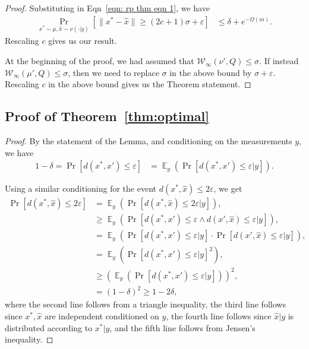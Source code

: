 \documentclass{article}
\newcommand{\norm}[1]{\|#1\|}
\newcommand{\wh}{\widehat}
\newcommand{\eps}{\varepsilon}
\DeclareMathOperator*{\E}{\mathbb{E}}
\newcommand{\xhat}{\wh{x}}
\newcommand{\cW}{\mathcal W}
\begin{document}
\begin{proof}
		Substituting in Eqn~\eqref{eqn: rp thm eqn 1}, we have
		\begin{align*}
			\Pr_{x^*\sim \mu, \widehat{x} \sim \nu( \cdot | y)}\left[\norm{ x^* - \wh{x} } \geq (2c+1)\sigma + \eps \right] & \leq \delta +   e^{-\Omega(m)}.
		\end{align*}
		Rescaling $c$ gives us our result.
		
		At the beginning of the proof, we had assumed that $\cW_\infty(\nu',Q)\leq \sigma$.
		If instead $\cW_\infty(\mu',Q) \leq \sigma$, then we need to replace $\sigma$ in the above bound by $\sigma + \eps$.
		Rescaling $c$ in the above bound gives us the Theorem statement.

\end{proof}

\subsection{Proof of Theorem~\ref{thm:optimal}}
\begin{proof}
By the statement of the Lemma, and conditioning on the measurements $y$, we have
\begin{align*}
    1 - \delta = \Pr[ d(x^* , x') \leq \eps ] &= \E_{y } \left( \Pr[d(x^* , x') \leq \eps | y ] \right).
\end{align*}

Using a similar conditioning for the event $d(x^* , \xhat) \leq 2 \eps$, we get
\begin{align*}
    \Pr[ d(x^* , \xhat) \leq 2\eps ] &= \E_{y} \left( \Pr[ d(x^* , \xhat) \leq 2\eps | y ] \right),\\ 
   &\geq \E_{y}  \left( \Pr[d(x^* , x') \leq \eps  \land d(x' , \xhat) \leq \eps  | y ] \right),\\ 
   &= \E_{y}  \left( \Pr[ d(x^* , x') \leq \eps | y ] \cdot \Pr[ d(x' , \xhat) \leq \eps  | y ] \right),\\ 
   &= \E_{y}  \left( \Pr[ d(x^* , x') \leq \eps | y ]^2  \right),\\ 
   &\geq \left(\E_{y}  \left( \Pr[d(x^* , x') \leq \eps | y ]  \right)\right)^2,\\ 
   &= (1-\delta)^2 \geq 1 - 2\delta,
\end{align*}
where the second line follows from a triangle inequality, the third line follows since $x^*, \xhat$ are independent conditioned on $y$, the fourth line follows since $\xhat|y$ is distributed according to $x^* | y$, and the fifth line follows from Jensen's inequality.

\end{proof}
\end{document}
